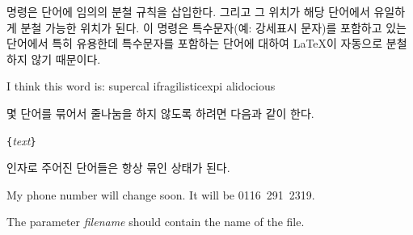 \ci{-} 명령은 단어에 임의의 분철 규칙을 삽입한다. 그리고 그 위치가 해당 단어에서 유일하게 분철 가능한 위치가 된다.
이 명령은 특수문자(예: 강세표시 문자)를 포함하고 있는 단어에서 특히 유용한데 특수문자를 포함하는 단어에 대하여 
\LaTeX 이 자동으로 분철하지 않기 때문이다.

\begin{example}
I think this word is: su\-per\-cal\-%
i\-frag\-i\-lis\-tic\-ex\-pi\-%
al\-i\-do\-cious
\end{example}

몇 단어를 묶어서 줄나눔을 하지 않도록 하려면 다음과 같이 한다.
\begin{lscommand}
\verb|{|\emph{text}\verb|}|
\end{lscommand}
\noindent 인자로 주어진 단어들은 항상 묶인 상태가 된다.



\begin{example}
My phone number will change soon.
It will be \mbox{0116 291 2319}.

The parameter
\mbox{\emph{filename}} should
contain the name of the file.
\end{example}

